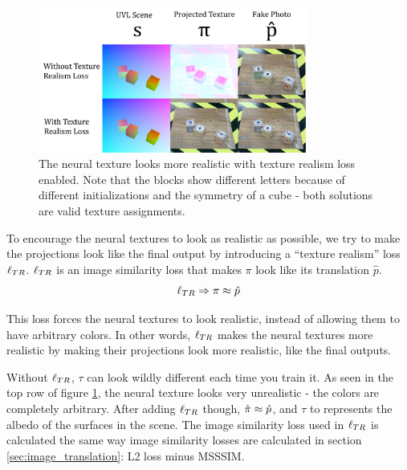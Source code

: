 \documentclass{article}
\begin{document}
	\begin{figure}[H]
		\begin{center}
			\includegraphics[width=250pt]{../images/texture_realism_ablation.pdf}
		\end{center}
		\caption{
			The neural texture looks more realistic with texture realism loss enabled. Note that the blocks show different letters because of different initializations and the symmetry of a cube - both solutions are valid texture assignments. 
		}
		\label{fig:texture_realism_ablation}
	\end{figure}



	To encourage the neural textures to look as realistic as possible, we try to make the projections look like the final output by introducing a ``texture realism'' loss $\ell_{TR}$. 
	$\ell_{TR}$ is an image similarity loss that makes $\pi$ look like its translation $\hat{p}$.
	\begin{equation}
		\ell_{TR} \Rightarrow \pi \approx \hat{p}
	\end{equation}

	This loss forces the neural textures to look realistic, instead of allowing them to have arbitrary colors.
	In other words, $\ell_{TR}$ makes the neural textures more realistic by making their projections look more realistic, like the final outputs.


	Without $\ell_{TR}$, $\tau$ can look wildly different each time you train it.
	As seen in the top row of figure \ref{fig:texture_realism_ablation}, the neural texture looks very unrealistic - the colors are completely arbitrary.
	After adding $\ell_{TR}$ though, $\hat{\pi} \approx \hat{p}$, and $\tau$ to represents the albedo of the surfaces in the scene.
	The image similarity loss used in $\ell_{TR}$ is calculated the same way image similarity losses are calculated in section \ref{sec:image_translation}: L2 loss minus MSSSIM.
	
\end{document}
